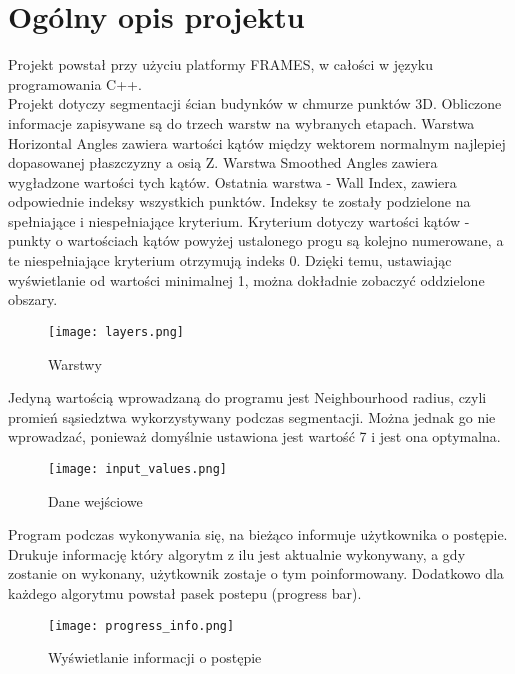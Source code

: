 	\chapter{Ogólny opis projektu}
	Projekt powstał przy użyciu platformy FRAMES, w całości w języku programowania C++.\\
	
	Projekt dotyczy segmentacji ścian budynków w chmurze punktów 3D. Obliczone informacje zapisywane są do trzech warstw na wybranych etapach. Warstwa Horizontal Angles zawiera wartości kątów między wektorem normalnym najlepiej dopasowanej płaszczyzny a osią Z. Warstwa Smoothed Angles zawiera wygładzone wartości tych kątów. Ostatnia warstwa - Wall Index, zawiera odpowiednie indeksy wszystkich punktów. Indeksy te zostały podzielone na spełniające i niespełniające kryterium. Kryterium dotyczy wartości kątów - punkty o wartościach kątów powyżej ustalonego progu są kolejno numerowane, a te niespełniające kryterium otrzymują indeks 0. Dzięki temu, ustawiając wyświetlanie od wartości minimalnej 1, można dokładnie zobaczyć oddzielone obszary.\cite{pomerleau:hal-01178661} \\
	
	\begin{figure}[h!]%
		\centering%
		\texttt{[image: layers.png]}%
		\caption{Warstwy}%
		\label{fig:layers}%
	\end{figure}
	
	Jedyną wartością wprowadzaną do programu jest Neighbourhood radius, czyli promień sąsiedztwa wykorzystywany podczas segmentacji. Można jednak go nie wprowadzać, ponieważ domyślnie ustawiona jest wartość 7 i jest ona optymalna. \\

	\begin{figure}[h!]
		\centering
		\texttt{[image: input\_values.png]}
		\caption{Dane wejściowe}
		\label{fig:input}
	\end{figure}
	
	Program podczas wykonywania się, na bieżąco informuje użytkownika o postępie. Drukuje informację który algorytm z ilu jest aktualnie wykonywany, a gdy zostanie on wykonany, użytkownik zostaje o tym poinformowany. Dodatkowo dla każdego algorytmu powstał pasek postepu (progress bar).
	
	\begin{figure}[h!]
		\centering
		\texttt{[image: progress\_info.png]}
		\caption{Wyświetlanie informacji o postępie}
		\label{fig:progress_info}
	\end{figure}